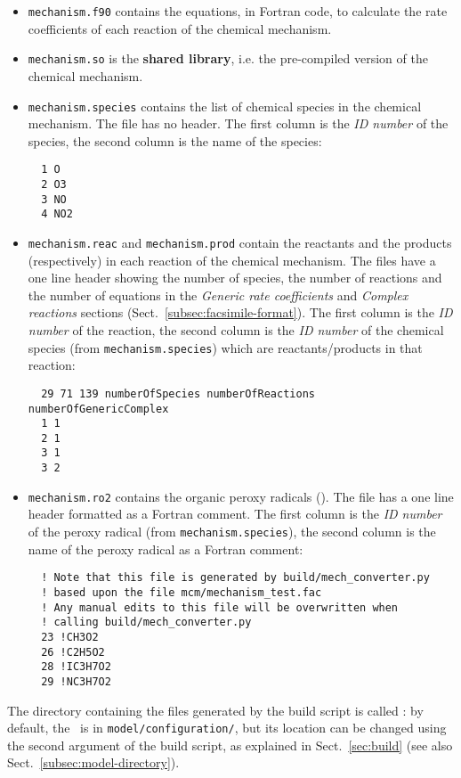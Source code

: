 \begin{itemize}
\item \texttt{mechanism.f90} contains the equations, in Fortran code,
  to calculate the rate coefficients of each reaction of the chemical
  mechanism.
\item \texttt{mechanism.so} is the \textbf{shared library}, i.e. the
  pre-compiled version of the chemical mechanism.
\item \texttt{mechanism.species} contains the list of chemical species
  in the chemical mechanism. The file has no header. The first column
  is the \emph{ID number} of the species, the second column is the
  name of the species:
  \begin{verbatim}
  1 O
  2 O3
  3 NO
  4 NO2
  \end{verbatim}
\item \texttt{mechanism.reac} and \texttt{mechanism.prod} contain the
  reactants and the products (respectively) in each reaction of the
  chemical mechanism. The files have a one line header showing the
  number of species, the number of reactions and the number of
  equations in the \emph{Generic rate coefficients} and
  \emph{Complex reactions} sections (Sect.~\ref{subsec:facsimile-format}).
  The first column is the \emph{ID number} of the reaction, the second
  column is the \emph{ID number} of the chemical species (from
  \texttt{mechanism.species}) which are reactants/products in that
  reaction:
  \begin{verbatim}
  29 71 139 numberOfSpecies numberOfReactions numberOfGenericComplex
  1 1
  2 1
  3 1
  3 2
\end{verbatim}
\item \texttt{mechanism.ro2} contains the organic peroxy radicals
  (). The file has a one line header formatted as a Fortran
  comment. The first column is the \emph{ID number} of the peroxy
  radical (from \texttt{mechanism.species}), the second column is the
  name of the peroxy radical as a Fortran comment:
  \begin{verbatim}
  ! Note that this file is generated by build/mech_converter.py
  ! based upon the file mcm/mechanism_test.fac
  ! Any manual edits to this file will be overwritten when
  ! calling build/mech_converter.py
  23 !CH3O2
  26 !C2H5O2
  28 !IC3H7O2
  29 !NC3H7O2
  \end{verbatim}
\end{itemize}

The directory containing the files generated by the build script is
called \sharedir: by default, the \sharedir\ is in
\texttt{model/configuration/}, but its location can be changed using
the second argument of the build script, as explained in
Sect.~\ref{sec:build} (see also Sect.~\ref{subsec:model-directory}).

